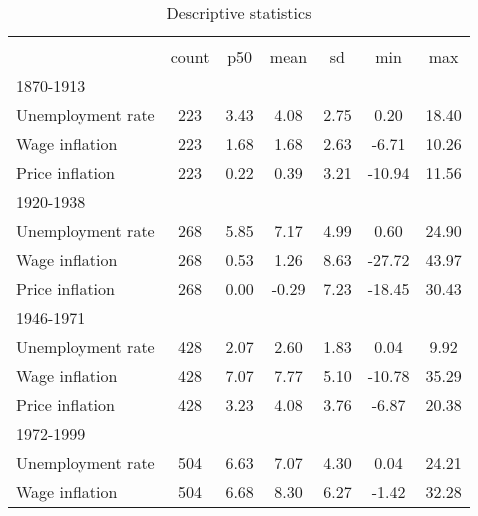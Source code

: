 \begin{table}[htbp]\centering
\def\sym#1{\ifmmode^{#1}\else\(^{#1}\)\fi}
\caption{Descriptive statistics \label{T:Descriptives}}
\begin{tabular}{l*{1}{cccccc}}
\hline\hline
                    &\multicolumn{6}{c}{}                                                         \\
                    &       count&         p50&        mean&          sd&         min&         max\\
\hline
1870-1913           &            &            &            &            &            &            \\
Unemployment rate   &         223&        3.43&        4.08&        2.75&        0.20&       18.40\\
Wage inflation      &         223&        1.68&        1.68&        2.63&       -6.71&       10.26\\
Price inflation     &         223&        0.22&        0.39&        3.21&      -10.94&       11.56\\
\hline
1920-1938           &            &            &            &            &            &            \\
Unemployment rate   &         268&        5.85&        7.17&        4.99&        0.60&       24.90\\
Wage inflation      &         268&        0.53&        1.26&        8.63&      -27.72&       43.97\\
Price inflation     &         268&        0.00&       -0.29&        7.23&      -18.45&       30.43\\
\hline
1946-1971           &            &            &            &            &            &            \\
Unemployment rate   &         428&        2.07&        2.60&        1.83&        0.04&        9.92\\
Wage inflation      &         428&        7.07&        7.77&        5.10&      -10.78&       35.29\\
Price inflation     &         428&        3.23&        4.08&        3.76&       -6.87&       20.38\\
\hline
1972-1999           &            &            &            &            &            &            \\
Unemployment rate   &         504&        6.63&        7.07&        4.30&        0.04&       24.21\\
Wage inflation      &         504&        6.68&        8.30&        6.27&       -1.42&       32.28\\

\end{tabular}
\end{table}

